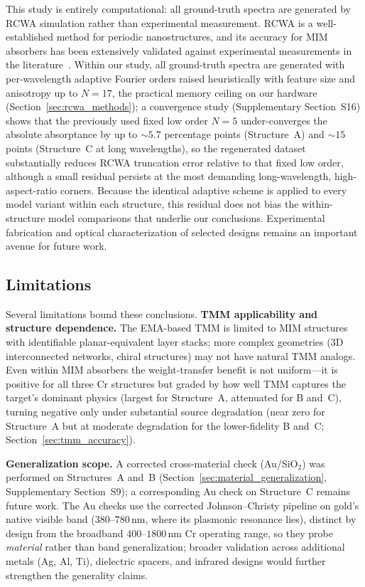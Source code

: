 \documentclass[a4paper,fleqn]{cas-sc}
\begin{document}
This study is entirely computational: all ground-truth spectra are generated by RCWA simulation rather than experimental measurement. RCWA is a well-established method for periodic nanostructures, and its accuracy for MIM absorbers has been extensively validated against experimental measurements in the literature~\cite{liu2010infrared,landy2008perfect}. Within our study, all ground-truth spectra are generated with per-wavelength adaptive Fourier orders raised heuristically with feature size and anisotropy up to $N=17$, the practical memory ceiling on our hardware (Section~\ref{sec:rcwa_methods}); a convergence study (Supplementary Section~S16) shows that the previously used fixed low order $N=5$ under-converges the absolute absorptance by up to ${\sim}5.7$ percentage points (Structure~A) and ${\sim}15$ points (Structure~C at long wavelengths), so the regenerated dataset substantially reduces RCWA truncation error relative to that fixed low order, although a small residual persists at the most demanding long-wavelength, high-aspect-ratio corners. Because the identical adaptive scheme is applied to every model variant within each structure, this residual does not bias the within-structure model comparisons that underlie our conclusions. Experimental fabrication and optical characterization of selected designs remains an important avenue for future work.

\subsection{Limitations}

Several limitations bound these conclusions. \textbf{TMM applicability and structure dependence.} The EMA-based TMM is limited to MIM structures with identifiable planar-equivalent layer stacks; more complex geometries (3D interconnected networks, chiral structures) may not have natural TMM analogs. Even within MIM absorbers the weight-transfer benefit is not uniform---it is positive for all three Cr structures but graded by how well TMM captures the target's dominant physics (largest for Structure~A, attenuated for B and~C), turning negative only under substantial source degradation (near zero for Structure~A but at moderate degradation for the lower-fidelity B and~C; Section~\ref{sec:tmm_accuracy}).

\textbf{Generalization scope.} A corrected cross-material check (Au/SiO$_2$) was performed on Structures~A and~B (Section~\ref{sec:material_generalization}, Supplementary Section~S9); a corresponding Au check on Structure~C remains future work. The Au checks use the corrected Johnson--Christy pipeline on gold's native visible band ($380$--$780$\,nm, where its plasmonic resonance lies), distinct by design from the broadband $400$--$1800$\,nm Cr operating range, so they probe \emph{material} rather than band generalization; broader validation across additional metals (Ag, Al, Ti), dielectric spacers, and infrared designs would further strengthen the generality claims.
\end{document}
